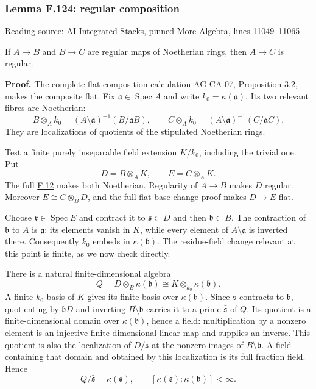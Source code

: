 \documentclass[11pt,a4paper,openany]{report}
\begin{document}
\label{AG-RG-S05-more-algebra-lemma-regular-composition}

\subsubsection{Lemma F.124: regular composition}\label{AG-RG-S05-lemma-f.124-regular-composition}

Reading source: \href{https://github.com/KokunoYumeto/unofficial-stacks-project-ai-drafts/blob/565b10e987aba5969b21145a0833f42d69f96790/more-algebra.tex\#L11049-L11065}{AI Integrated Stacks, pinned More Algebra, lines 11049--11065}.

If \(A\to B\) and \(B\to C\) are regular maps of Noetherian rings, then \(A\to C\) is regular.

\textbf{Proof.} The complete flat-composition calculation AG-CA-07, Proposition 3.2, makes the composite flat. Fix \(\mathfrak a\in\operatorname{Spec}A\) and write \(k_0=\kappa(\mathfrak a)\). Its two relevant fibres are Noetherian: \[
B\otimes_Ak_0=(A\setminus\mathfrak a)^{-1}(B/\mathfrak aB),
\qquad
C\otimes_Ak_0=(A\setminus\mathfrak a)^{-1}(C/\mathfrak aC).
\] They are localizations of quotients of the stipulated Noetherian rings.

Test a finite purely inseparable field extension \(K/k_0\), including the trivial one. Put \[D=B\otimes_AK,\qquad E=C\otimes_AK.\] The full \hyperref[AG-RG-S05-algebra-lemma-Noetherian-field-extension]{F.12} makes both Noetherian. Regularity of \(A\to B\) makes \(D\) regular. Moreover \(E\cong C\otimes_BD\), and the full flat base-change proof makes \(D\to E\) flat.

Choose \(\mathfrak r\in\operatorname{Spec}E\) and contract it to \(\mathfrak s\subset D\) and then \(\mathfrak b\subset B\). The contraction of \(\mathfrak b\) to \(A\) is \(\mathfrak a\): its elements vanish in \(K\), while every element of \(A\setminus\mathfrak a\) is inverted there. Consequently \(k_0\) embeds in \(\kappa(\mathfrak b)\). The residue-field change relevant at this point is finite, as we now check directly.

There is a natural finite-dimensional algebra \[
Q=D\otimes_B\kappa(\mathfrak b)
\cong K\otimes_{k_0}\kappa(\mathfrak b).
\] A finite \(k_0\)-basis of \(K\) gives its finite basis over \(\kappa(\mathfrak b)\). Since \(\mathfrak s\) contracts to \(\mathfrak b\), quotienting by \(\mathfrak bD\) and inverting \(B\setminus\mathfrak b\) carries it to a prime \(\bar{\mathfrak s}\) of \(Q\). Its quotient is a finite-dimensional domain over \(\kappa(\mathfrak b)\), hence a field: multiplication by a nonzero element is an injective finite-dimensional linear map and supplies an inverse. This quotient is also the localization of \(D/\mathfrak s\) at the nonzero images of \(B\setminus\mathfrak b\). A field containing that domain and obtained by this localization is its full fraction field. Hence \[Q/\bar{\mathfrak s}=\kappa(\mathfrak s),\qquad
[\kappa(\mathfrak s):\kappa(\mathfrak b)]<\infty.\]
\end{document}
